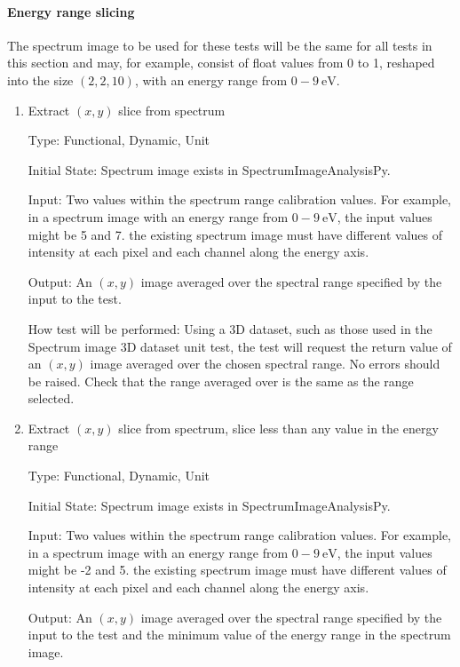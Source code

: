 \documentclass[12pt, titlepage]{article}
\newcommand{\progname}{SpectrumImageAnalysisPy}
\begin{document}
\paragraph{Energy range slicing}

The spectrum image to be used for these tests will be the same for all tests in
this section and may, for example, consist of float values from 0 to 1, reshaped
into the size $(2,2,10)$, with an energy range from $0-9\ \si{\electronvolt}$.

\begin{enumerate}

\item{Extract $(x,y)$ slice from spectrum}

Type: Functional, Dynamic, Unit

Initial State: Spectrum image exists in \progname{}.

Input: Two values within the spectrum range calibration values. For example, in
a spectrum image with an energy range from $0-9\ \si{\electronvolt}$, the input
values might be 5 and 7. the existing spectrum image must have different values
of intensity at each pixel and each channel along the energy axis.

Output: An $(x,y)$ image averaged over the spectral range specified by the input
to the test.

How test will be performed: Using a 3D dataset, such as those used in the
Spectrum image 3D dataset unit test, the test will request the return value of
an $(x,y)$ image averaged over the chosen spectral range. No errors should be
raised. Check that the range averaged over is the same as the range selected.


\item{Extract $(x,y)$ slice from spectrum, slice less than any value in the
energy range}

Type: Functional, Dynamic, Unit

Initial State: Spectrum image exists in \progname{}.

Input: Two values within the spectrum range calibration values. For example, in
a spectrum image with an energy range from $0-9\ \si{\electronvolt}$, the input
values might be -2 and 5. the existing spectrum image must have different values
of intensity at each pixel and each channel along the energy axis.

Output: An $(x,y)$ image averaged over the spectral range specified by the input
to the test and the minimum value of the energy range in the spectrum image.


\end{enumerate}
\end{document}
